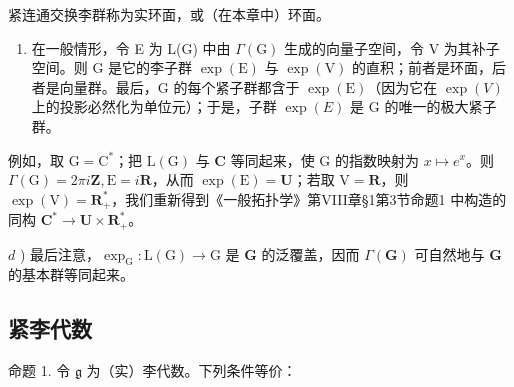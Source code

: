 紧连通交换李群称为实环面，或（在本章中）环面。

\begin{enumerate}
\def\labelenumi{\alph{enumi})}
\setcounter{enumi}{2}
\tightlist
\item
  在一般情形，令 E 为 L(G) 中由 \(\Gamma(\mathrm{G})\) 生成的向量子空间，令 V 为其补子空间。则 G 是它的李子群 \(\exp(\mathrm{E})\) 与 \(\exp(\mathrm{V})\) 的直积；前者是环面，后者是向量群。最后，G 的每个紧子群都含于 \(\exp(\mathrm{E})\)（因为它在 \(\exp(V)\) 上的投影必然化为单位元）；于是，子群 \(\exp(E)\) 是 G 的唯一的极大紧子群。
\end{enumerate}

例如，取 \(\mathrm{G} = \mathrm{C}^*\)；把 \(\mathrm{L(G)}\) 与 \(\mathbf{C}\) 等同起来，使 \(\mathrm{G}\) 的指数映射为 \(x \mapsto e^x\)。则 \(\Gamma(\mathrm{G}) = 2\pi i\mathbf{Z}, \mathrm{E} = i\mathbf{R}\)，从而 \(\exp(\mathrm{E}) = \mathbf{U}\)；若取 \(\mathrm{V} = \mathbf{R}\)，则 \(\exp(\mathrm{V}) = \mathbf{R}_+^*\)，我们重新得到《一般拓扑学》第VIII章§1第3节命题1 中构造的同构 \(\mathbf{C}^* \to \mathbf{U} \times \mathbf{R}_+^*\)。

\(d\) ) 最后注意，\(\exp_{\mathrm{G}}:\mathrm{L}(\mathrm{G})\to \mathrm{G}\) 是 \(\mathbf{G}\) 的泛覆盖，因而 \(\Gamma (\mathbf{G})\) 可自然地与 \(\mathbf{G}\) 的基本群等同起来。

\subsection{紧李代数}

命题 1. 令 \(\mathfrak{g}\) 为（实）李代数。下列条件等价：

